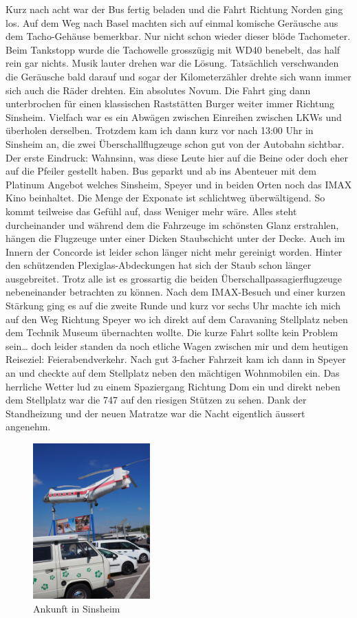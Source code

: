Kurz nach acht war der Bus fertig beladen und die Fahrt Richtung Norden ging los.
Auf dem Weg nach Basel machten sich auf einmal komische Geräusche aus dem Tacho-Gehäuse bemerkbar.
Nur nicht schon wieder dieser blöde Tachometer.
Beim Tankstopp wurde die Tachowelle grosszügig mit WD40 benebelt, das half rein gar nichts.
Musik lauter drehen war die Lösung.
Tatsächlich verschwanden die Geräusche bald darauf und sogar der Kilometerzähler drehte sich wann immer sich auch die Räder drehten.
Ein absolutes Novum.
Die Fahrt ging dann unterbrochen für einen klassischen Raststätten Burger weiter immer Richtung Sinsheim.
Vielfach war es ein Abwägen zwischen Einreihen zwischen LKWs und überholen derselben.
Trotzdem kam ich dann kurz vor nach 13:00 Uhr in Sinsheim an, die zwei Überschallflugzeuge schon gut von der Autobahn sichtbar.
Der erste Eindruck: Wahnsinn, was diese Leute hier auf die Beine oder doch eher auf die Pfeiler gestellt haben.
Bus geparkt und ab ins Abenteuer mit dem Platinum Angebot welches Sinsheim, Speyer und in beiden Orten noch das IMAX Kino beinhaltet.
Die Menge der Exponate ist schlichtweg überwältigend.
So kommt teilweise das Gefühl auf, dass Weniger mehr wäre.
Alles steht durcheinander und während dem die Fahrzeuge im schönsten Glanz erstrahlen, hängen die Flugzeuge unter einer Dicken Staubschicht unter der Decke.
Auch im Innern der Concorde ist leider schon länger nicht mehr gereinigt worden.
Hinter den schützenden Plexiglas-Abdeckungen hat sich der Staub schon länger ausgebreitet.
Trotz alle ist es grossartig die beiden Überschallpassagierflugzeuge nebeneinander betrachten zu können.
Nach dem IMAX-Besuch und einer kurzen Stärkung ging es auf die zweite Runde und kurz vor sechs Uhr machte ich mich auf den Weg Richtung Speyer wo ich direkt auf dem Caravaning Stellplatz neben dem Technik Museum übernachten wollte.
Die kurze Fahrt sollte kein Problem sein\dots{} doch leider standen da noch etliche Wagen zwischen mir und dem heutigen Reiseziel: Feierabendverkehr.
Nach gut 3-facher Fahrzeit kam ich dann in Speyer an und checkte auf dem Stellplatz neben den mächtigen Wohnmobilen ein.
Das herrliche Wetter lud zu einem Spaziergang Richtung Dom ein und direkt neben dem Stellplatz war die 747 auf den riesigen Stützen zu sehen.
Dank der Standheizung und der neuen Matratze war die Nacht eigentlich äussert angenehm. 

\begin{figure}[t]
    \centering
    \includegraphics[width=0.4\textwidth]{../Bilder/Sinsheim/3.jpg}
    \caption{Ankunft in Sinsheim}
    \label{img:Sinsheim}
\end{figure}

